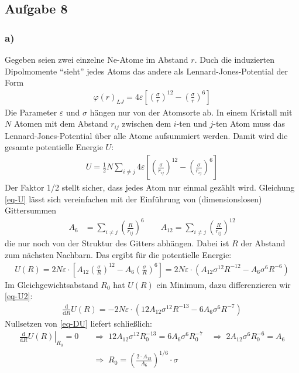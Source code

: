 \documentclass[11pt]{article}
\begin{document}
\subsection*{Aufgabe 8}
\subsubsection*{a)}
Gegeben seien zwei einzelne Ne-Atome im Abstand $r$. Duch die induzierten
Dipolmomente "`sieht"' jedes Atoms das andere als Lennard-Jones-Potential der Form
\begin{align}
  \varphi(r)_{LJ} = 4 \varepsilon \left[ \left(\frac{\sigma}{r}\right)^{12} -
    \left(\frac{\sigma}{r}\right)^{6} \right]
\end{align}
Die Parameter $\varepsilon$ und $\sigma$ hängen nur von der Atomsorte ab.
In einem Kristall mit $N$ Atomen mit dem Abstand $r_{ij}$ zwischen dem
$i$-ten und $j$-ten Atom muss das Lennard-Jones-Potential über alle Atome
aufsummiert werden. Damit wird die gesamte potentielle Energie $U$:
\begin{align}
\label{eq-U}
  U = \frac{1}{2} N \sum_{i \ne j} 4 \varepsilon
  \left[ \left(\frac{\sigma}{r_{ij}}\right)^{12} -
  \left(\frac{\sigma}{r_{ij}}\right)^{6} \right]
\end{align}
Der Faktor 1/2 stellt sicher, dass jedes Atom nur einmal gezählt wird.
Gleichung \eqref{eq-U} lässt sich vereinfachen mit der Einführung von
(dimensionslosen) Gittersummen
\begin{align*}
  A_6 & = \left . \sum_{i \ne j} \left(\frac{R}{r_{ij}}\right)^6 \right .\qquad
  A_{12} = \sum_{i \ne j} \left(\frac{R}{r_{ij}}\right)^{12}
\end{align*}
die nur noch von der Struktur des Gitters abhängen.  Dabei ist $R$ der Abstand
zum nächsten Nachbarn. Das ergibt für die potentielle Energie:
\begin{align}
\label{eq-U2}
  U(R) = 2 N \varepsilon \cdot \left[ A_{12} \left(\frac{\sigma}{R}\right)^{12} -
  A_6 \left(\frac{\sigma}{R}\right)^{6} \right] =
  2 N \varepsilon \cdot \left( A_{12} \sigma^{12} R^{-12} -
  A_6 \sigma^6 R^{-6} \right)
\end{align}
Im Gleichgewichtsabstand $R_0$ hat $U(R)$ ein Minimum, dazu differenzieren
wir \eqref{eq-U2}:
\begin{align}
\label{eq-DU}
  \frac{\mathrm{d}}{\mathrm{d} R} U(R) = - 2 N \varepsilon \cdot
    \left(12 A_{12} \sigma^{12} R^{-13} - 6 A_6 \sigma^6 R^{-7} \right)
\end{align}
Nullsetzen von \eqref{eq-DU} liefert schließlich:
\begin{align}
  \nonumber
  \left. \frac{\mathrm{d}}{\mathrm{d} R} U(R) \right|_{R_0} = 0 \quad& \Rightarrow\;
  12 A_{12} \sigma^{12} R_0^{-13} = 6 A_6 \sigma^6 R_0^{-7} \quad \Rightarrow\;
  2 A_{12} \sigma^6 R_0^{-6} = A_6 \\
  \label{eq-R0}
  \;& \Rightarrow\; R_0 = \left(\frac{2 \cdot A_{12}}{A_6}\right)^{1/6} \cdot \sigma
\end{align}
\end{document}
